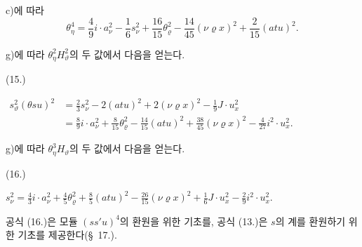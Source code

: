 c)에 따라
\[
\theta_\eta^4=\frac49i\cdot a_\nu^2-\frac16s_\nu^2+\frac{16}{15}\theta_\varrho^2-\frac{14}{45}(\nu\varrho x)^2+\frac2{15}(atu)^2.
\]

g)에 따라 $\theta_\eta^2H_\vartheta^2$의 두 값에서 다음을 얻는다.
\par\smallskip\noindent
\begin{minipage}[c]{3.6em}
\centering (15.)
\end{minipage}%
\begin{minipage}[c]{\dimexpr\linewidth-3.6em\relax}
\centering
\(\displaystyle
\begin{aligned}
s_\vartheta^2(\theta su)^2
&=\frac23s_\nu^2-2(atu)^2+2(\nu\varrho x)^2-\frac19J\cdot u_x^2\\
&=\frac89i\cdot a_\nu^2+\frac8{15}\theta_\varrho^2-\frac{14}{15}(atu)^2+\frac{38}{45}(\nu\varrho x)^2-\frac4{27}i^2\cdot u_x^2.
\end{aligned}
\)
\end{minipage}
\par\smallskip

g)에 따라 $\theta_\eta^3H_\vartheta$의 두 값에서 다음을 얻는다.
\par\smallskip\noindent
\begin{minipage}[c]{3.6em}
\centering (16.)
\end{minipage}%
\begin{minipage}[c]{\dimexpr\linewidth-3.6em\relax}
\centering
\(\displaystyle
s_\nu^2=\frac43i\cdot a_\nu^2+\frac45\theta_\varrho^2+\frac85(atu)^2-\frac{26}{15}(\nu\varrho x)^2+\frac16J\cdot u_x^2-\frac29i^2\cdot u_x^2.
\)
\end{minipage}
\par\smallskip

공식 (16.)은 모듈 $(ss'u)^4$의 환원을 위한 기초를, 공식 (13.)은 $s$의 계를 환원하기 위한 기초를 제공한다(\S\ 17.).

